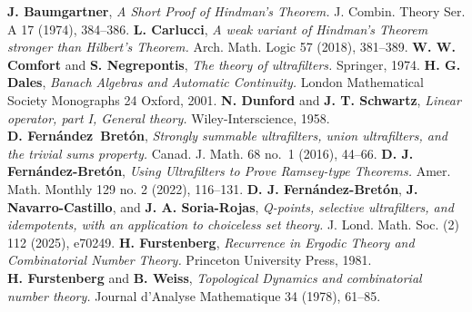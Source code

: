 \documentclass{jloganal}
\theoremstyle{definition}
\begin{document}
\begin{thebibliography}

    {\bf J. Baumgartner},
    {\it A Short Proof of Hindman's Theorem.}
    J. Combin. Theory Ser. A
    17 (1974), 384--386.
     {\bf L. Carlucci},
    {\it A weak variant of Hindman’s Theorem stronger than Hilbert’s Theorem.}
    Arch. Math. Logic
    57 (2018), 381--389.
    {\bf W. W. Comfort} and {\bf S. Negrepontis},
    {\it The theory of ultrafilters.}
    Springer, 1974.
    {\bf H. G. Dales},
    {\it Banach Algebras and Automatic Continuity.}
    London Mathematical Society Monographs 24
    Oxford, 2001.
    {\bf N. Dunford} and {\bf J. T. Schwartz},
    {\it Linear operator, part I, General theory.}
    Wiley-Interscience, 1958.\\
    {\bf D. Fern\'andez~Bret\'on},
    {\it Strongly summable ultrafilters, union ultrafilters, and the trivial sums property.}
    Canad. J. Math.
    68 no.~1 (2016), 44--66.
     {\bf D. J. Fern\'andez-Bret\'on},
     {\it Using Ultrafilters to Prove Ramsey-type Theorems.}
     Amer. Math. Monthly
     129 no. 2 (2022), 116--131.
    {\bf D. J. Fern\'andez-Bret\'on}, {\bf J. Navarro-Castillo}, and {\bf J. A. Soria-Rojas},
    {\it Q-points, selective ultrafilters, and idempotents, with an application to choiceless set theory.}
    J. Lond. Math. Soc. (2)
    112 (2025), e70249.
    {\bf H. Furstenberg},
    {\it Recurrence in Ergodic Theory and Combinatorial Number Theory.}
    Princeton University Press, 1981. \\
    {\bf H. Furstenberg} and {\bf B. Weiss},
    {\it Topological Dynamics and combinatorial number theory.}
    Journal d'Analyse Mathematique
    34 (1978), 61--85.\\

\end{thebibliography}
\end{document}
